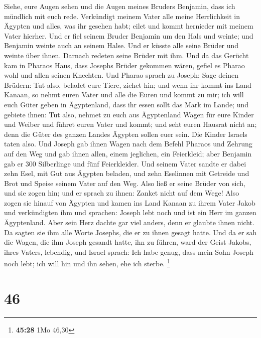  Siehe, eure Augen sehen und die Augen meines Bruders
Benjamin, dass ich mündlich mit euch rede.  Verkündigt
meinem Vater alle meine Herrlichkeit in Ägypten und alles, was ihr
gesehen habt; eilet und kommt hernieder mit meinem Vater hierher.
 Und er fiel seinem Bruder Benjamin um den Hals und weinte;
und Benjamin weinte auch an seinem Halse.  Und er küsste
alle seine Brüder und weinte über ihnen. Darnach redeten seine Brüder
mit ihm.  Und da das Gerücht kam in Pharaos Haus, dass
Josephs Brüder gekommen wären, gefiel es Pharao wohl und allen seinen
Knechten.  Und Pharao sprach zu Joseph: Sage deinen
Brüdern: Tut also, beladet eure Tiere, ziehet hin;  und
wenn ihr kommt ins Land Kanaan, so nehmt euren Vater und alle die Euren
und kommt zu mir; ich will euch Güter geben in Ägyptenland, dass ihr
essen sollt das Mark im Lande;  und gebiete ihnen: Tut
also, nehmet zu euch aus Ägyptenland Wagen für eure Kinder und Weiber
und führet euren Vater und kommt;  und seht euren Hausrat
nicht an; denn die Güter des ganzen Landes Ägypten sollen euer sein.
 Die Kinder Israels taten also. Und Joseph gab ihnen Wagen
nach dem Befehl Pharaos und Zehrung auf den Weg  und gab
ihnen allen, einem jeglichen, ein Feierkleid; aber Benjamin gab er 300
Silberlinge und fünf Feierkleider.  Und seinem Vater sandte
er dabei zehn Esel, mit Gut aus Ägypten beladen, und zehn Eselinnen mit
Getreide und Brot und Speise seinem Vater auf den Weg. 
Also ließ er seine Brüder von sich, und sie zogen hin; und er sprach zu
ihnen: Zanket nicht auf dem Wege!  Also zogen sie hinauf
von Ägypten und kamen ins Land Kanaan zu ihrem Vater Jakob 
und verkündigten ihm und sprachen: Joseph lebt noch und ist ein Herr im
ganzen Ägyptenland. Aber sein Herz dachte gar viel anders, denn er
glaubte ihnen nicht.  Da sagten sie ihm alle Worte Josephs,
die er zu ihnen gesagt hatte. Und da er sah die Wagen, die ihm Joseph
gesandt hatte, ihn zu führen, ward der Geist Jakobs, ihres Vaters,
lebendig,  und Israel sprach: Ich habe genug, dass mein
Sohn Joseph noch lebt; ich will hin und ihn sehen, ehe ich sterbe.
\footnote{\textbf{45:28} 1Mo 46,30}

\hypertarget{section-10}{%
\section{46}\label{section-10}}

